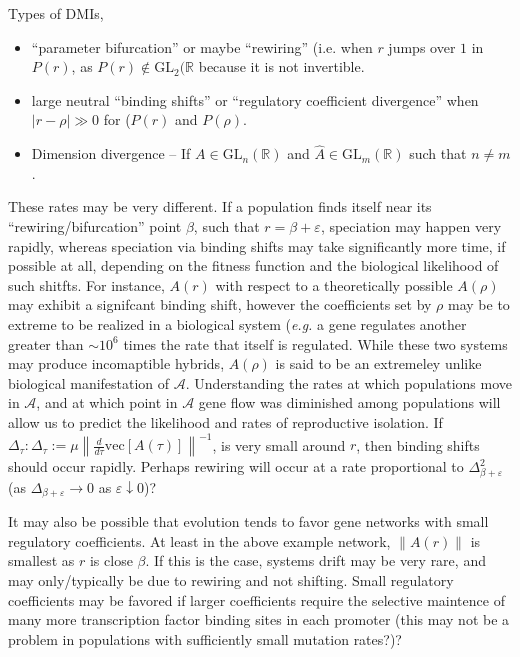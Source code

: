 \documentclass[11 pt]{article}
\newcommand{\A}{\mathcal{A}}
\newcommand{\1}{\mathbbm{1}}
\begin{document}
     Types of DMIs,
    \begin{itemize}
      \item ``parameter bifurcation'' or maybe ``rewiring'' (i.e. when $r$ jumps over $1$ in $P(r)$, as $P(r) \notin \text{GL}_{2}(\mathbb{R}$ because it is not invertible. 
      \item large neutral ``binding shifts'' or ``regulatory coefficient divergence'' when $| r - \rho | \gg 0$ for ($P(r)$ and $P(\rho)$.
      \item Dimension divergence -- If $A \in \text{GL}_{n}(\mathbb{R})$ and $\widehat{A} \in \text{GL}_{m}(\mathbb{R})$ such that $ n \neq m$.
    \end{itemize}
        These rates may be very different. If a population finds itself near its ``rewiring/bifurcation'' point $\beta$, such that $r=\beta + \varepsilon$, speciation may happen very rapidly, whereas speciation via binding shifts may take significantly more time, if possible at all, depending on the fitness function and the biological likelihood of such shitfts. For instance, $A(r)$ with respect to a theoretically possible $A(\rho)$ may exhibit a signifcant binding shift, however the coefficients set by $\rho$ may be to extreme to be realized in a biological system (\emph{e.g.} a gene regulates another greater than $\sim 10^{6}$ times the rate that itself is regulated. While these two systems may produce incomaptible hybrids, $A(\rho)$ is said to be an extremeley unlike biological manifestation of $\A$.
        Understanding the rates at which populations move in $\A$, and at which point in $\A$ gene flow was diminished among populations will allow us to predict the likelihood and rates of reproductive isolation. If $\Delta_{\tau} : \Delta_{\tau} := \mu \left\lVert \frac{d}{d \tau}\text{vec}\left[A(\tau)\right]\right\rVert^{-1}$, is very small around $r$, then binding shifts should occur rapidly. Perhaps rewiring will occur at a rate proportional to $\Delta^{2}_{\beta +\varepsilon}$ (as $\Delta_{\beta +\varepsilon} \rightarrow 0$ as $\varepsilon \downarrow 0$)?

        It may also be possible that evolution tends to favor gene networks with small regulatory coefficients. At least in the above example network, $\lVert A(r) \rVert$ is smallest as $r$ is close $\beta$. If this is the case, systems drift may be very rare, and may only/typically be due to rewiring and not shifting. Small regulatory coefficients may be favored if larger coefficients require the selective maintence of many more transcription factor binding sites in each promoter (this  may not be  a problem in populations with sufficiently small mutation rates?)?
\end{document}
